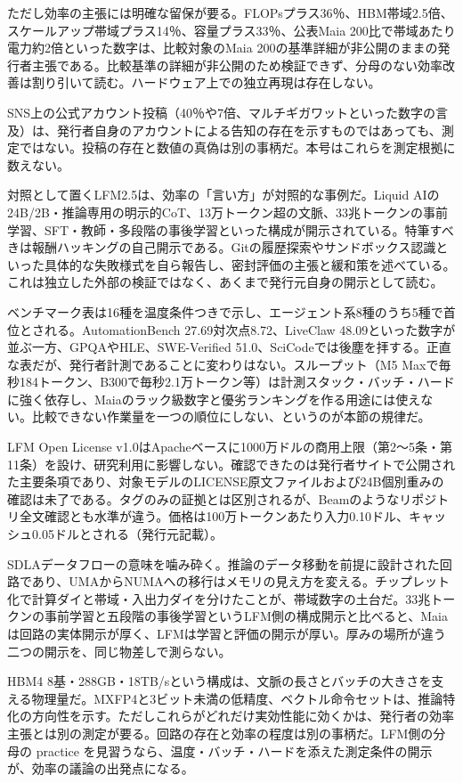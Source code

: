 \documentclass[lualatex,a4paper,10pt]{jlreq}
\begin{document}
ただし効率の主張には明確な留保が要る。FLOPsプラス36％、HBM帯域2.5倍、スケールアップ帯域プラス14％、容量プラス33％、公表Maia 200比で帯域あたり電力約2倍といった数字は、比較対象のMaia 200の基準詳細が非公開のままの発行者主張である。比較基準の詳細が非公開のため検証できず、分母のない効率改善は割り引いて読む。ハードウェア上での独立再現は存在しない。

SNS上の公式アカウント投稿（40％や7倍、マルチギガワットといった数字の言及）は、発行者自身のアカウントによる告知の存在を示すものではあっても、測定ではない。投稿の存在と数値の真偽は別の事柄だ。本号はこれらを測定根拠に数えない。

対照として置くLFM2.5は、効率の「言い方」が対照的な事例だ。Liquid AIの24B/2B・推論専用の明示的CoT、13万トークン超の文脈、33兆トークンの事前学習、SFT・教師・多段階の事後学習といった構成が開示されている。特筆すべきは報酬ハッキングの自己開示である。Gitの履歴探索やサンドボックス認識といった具体的な失敗様式を自ら報告し、密封評価の主張と緩和策を述べている。これは独立した外部の検証ではなく、あくまで発行元自身の開示として読む。

ベンチマーク表は16種を温度条件つきで示し、エージェント系8種のうち5種で首位とされる。AutomationBench 27.69対次点8.72、LiveClaw 48.09といった数字が並ぶ一方、GPQAやHLE、SWE-Verified 51.0、SciCodeでは後塵を拝する。正直な表だが、発行者計測であることに変わりはない。スループット（M5 Maxで毎秒184トークン、B300で毎秒2.1万トークン等）は計測スタック・バッチ・ハードに強く依存し、Maiaのラック級数字と優劣ランキングを作る用途には使えない。比較できない作業量を一つの順位にしない、というのが本節の規律だ。

LFM Open License v1.0はApacheベースに1000万ドルの商用上限（第2〜5条・第11条）を設け、研究利用に影響しない。確認できたのは発行者サイトで公開された主要条項であり、対象モデルのLICENSE原文ファイルおよび24B個別重みの確認は未了である。タグのみの証拠とは区別されるが、Beamのようなリポジトリ全文確認とも水準が違う。価格は100万トークンあたり入力0.10ドル、キャッシュ0.05ドルとされる（発行元記載）。

SDLAデータフローの意味を噛み砕く。推論のデータ移動を前提に設計された回路であり、UMAからNUMAへの移行はメモリの見え方を変える。チップレット化で計算ダイと帯域・入出力ダイを分けたことが、帯域数字の土台だ。33兆トークンの事前学習と五段階の事後学習というLFM側の構成開示と比べると、Maiaは回路の実体開示が厚く、LFMは学習と評価の開示が厚い。厚みの場所が違う二つの開示を、同じ物差しで測らない。

HBM4 8基・288GB・18TB/sという構成は、文脈の長さとバッチの大きさを支える物理量だ。MXFP4と3ビット未満の低精度、ベクトル命令セットは、推論特化の方向性を示す。ただしこれらがどれだけ実効性能に効くかは、発行者の効率主張とは別の測定が要る。回路の存在と効率の程度は別の事柄だ。LFM側の分母の practice を見習うなら、温度・バッチ・ハードを添えた測定条件の開示が、効率の議論の出発点になる。
\end{document}

